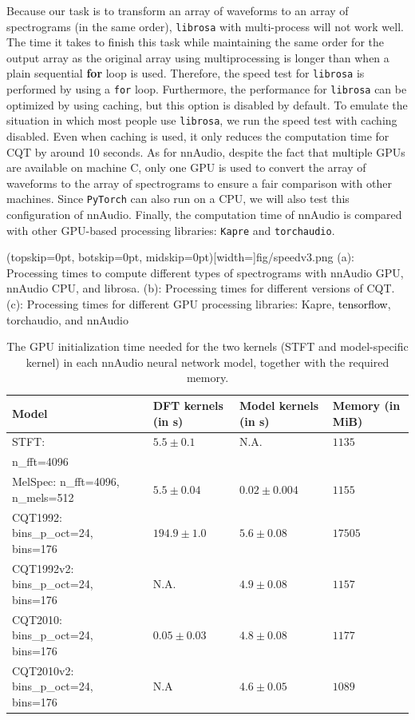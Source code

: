 \documentclass{ieeeaccess}
\newcommand{\nbh}[1]{\texttt{#1}}
\newcommand{\newtext}[1]{\textcolor{black}{#1}} %
\begin{document}
Because our task is to transform an array of waveforms to an array of spectrograms (in the same order), \nbh{librosa} with multi-process will not work well. The time it takes to finish this task while maintaining the same order for the output array as the original array using multiprocessing is longer than when a plain sequential \textbf{for} loop is used. Therefore, the speed test for \nbh{librosa} is performed by using a \nbh{for} loop. Furthermore, the performance for \nbh{librosa} can be optimized by using caching, but this option is disabled by default. To emulate the situation in which most people use \nbh{librosa}, we run the speed test with caching disabled. Even when caching is used, it only reduces the computation time for CQT by around 10 seconds. As for nnAudio, despite the fact that multiple GPUs are available on machine C, only one GPU is used to convert the array of waveforms to the array of spectrograms to ensure a fair comparison with other machines. Since \nbh{PyTorch} can also run on a CPU, we will also test this configuration of nnAudio. {Finally, the computation time of nnAudio is compared with other GPU-based processing libraries: \nbh{Kapre} and \nbh{torchaudio}.}


\Figure(topskip=0pt, botskip=0pt, midskip=0pt)[width=\linewidth]{fig/speedv3.png}
{(a): Processing times to compute different types of spectrograms with nnAudio GPU, nnAudio CPU, and librosa. (b): Processing times for different versions of CQT. (c): Processing times for different GPU processing libraries: Kapre, \newtext{tensorflow}, torchaudio, and nnAudio  \label{fig:speed}}




\begin{table}[h!]
\caption{The GPU initialization time needed for the two kernels (STFT and model-specific kernel) in each nnAudio neural network model, together with the required memory. }
\centering
\label{tab: mem}
\setlength{\tabcolsep}{5pt}
\begin{tabular}{p{60pt} p{45pt} p{45pt} p{35pt}}
\toprule
Model& 
DFT kernels (in s)& 
Model kernels (in s) & Memory (in MiB)\\\midrule
STFT:   & $5.5\pm 0.1$   & N.A. & $1135$\\
n\_fft=4096 & & & \\\hdashline
MelSpec:  n\_fft=4096, n\_mels=512 & $5.5\pm 0.04$  & $0.02\pm 0.004$ & $1155$\\\hdashline
CQT1992: bins\_p\_oct=24, bins=176  & $194.9\pm 1.0$ & $5.6 \pm 0.08$ & $17505$\\\hdashline
CQT1992v2: bins\_p\_oct=24, bins=176& N.A.           & $4.9 \pm 0.08$ & $1157$\\\hdashline
CQT2010: bins\_p\_oct=24, bins=176  & $0.05\pm 0.03$ & $4.8\pm 0.08$ & $1177$\\\hdashline
CQT2010v2: bins\_p\_oct=24, bins=176& N.A            & $4.6\pm 0.05$ & $1089$\\
\bottomrule
\end{tabular}
\label{tab: GPU_util}
\end{table}
\end{document}
